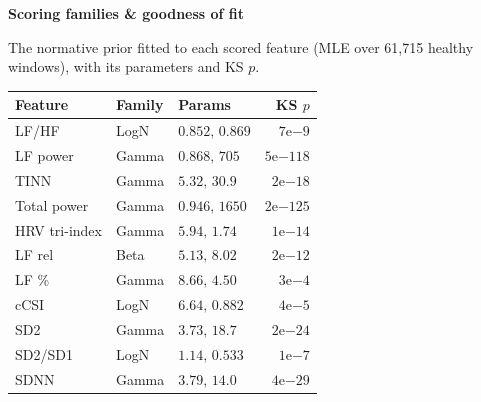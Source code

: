 \documentclass[fontsize=9pt]{scrartcl}
\renewcommand{\arraystretch}{1.35}
\newlength{\panelA}\setlength{\panelA}{97mm}
\newcommand{\ctitle}[2][jcgreen]{{\color{#1}\bfseries\large #2}\par\vspace{1.6mm}}
\begin{document}
\noindent%
\begin{minipage}[t][210mm][t]{\panelA}%
\begin{tcolorbox}[panel,colback=jcindigodk,width=\panelA,height=210mm,fontupper=\color{white}]
  \vspace{3mm}

  \begin{tcolorbox}[card, borderline west={2.2mm}{0mm}{jcgreen}]
    \ctitle[jcgreen]{Scoring families \& goodness of fit}
    {\color{inkdark}\footnotesize
     The normative prior fitted to each scored feature (MLE over
     61{,}715 healthy windows), with its parameters and KS $p$.\par}
    \vspace{1.6mm}
    {\color{inkdark}\footnotesize
    \renewcommand{\arraystretch}{1.28}%
    \setlength{\tabcolsep}{3.2pt}%
    \begin{tabular}{@{}l l l r@{}}
      \textbf{Feature} & \textbf{Family} & \textbf{Params} & \textbf{KS $p$}\\
      \hline
      LF/HF & LogN & $0.852,\,0.869$ & $7\mathrm{e}{-9}$\\
      LF power & Gamma & $0.868,\,705$ & $5\mathrm{e}{-118}$\\
      TINN & Gamma & $5.32,\,30.9$ & $2\mathrm{e}{-18}$\\
      Total power & Gamma & $0.946,\,1650$ & $2\mathrm{e}{-125}$\\
      HRV tri-index & Gamma & $5.94,\,1.74$ & $1\mathrm{e}{-14}$\\
      LF rel & Beta & $5.13,\,8.02$ & $2\mathrm{e}{-12}$\\
      LF \% & Gamma & $8.66,\,4.50$ & $3\mathrm{e}{-4}$\\
      cCSI & LogN & $6.64,\,0.882$ & $4\mathrm{e}{-5}$\\
      SD2 & Gamma & $3.73,\,18.7$ & $2\mathrm{e}{-24}$\\
      SD2/SD1 & LogN & $1.14,\,0.533$ & $1\mathrm{e}{-7}$\\
      SDNN & Gamma & $3.79,\,14.0$ & $4\mathrm{e}{-29}$\\

\end{tabular}}
\end{tcolorbox}
\end{tcolorbox}
\end{minipage}
\end{document}
